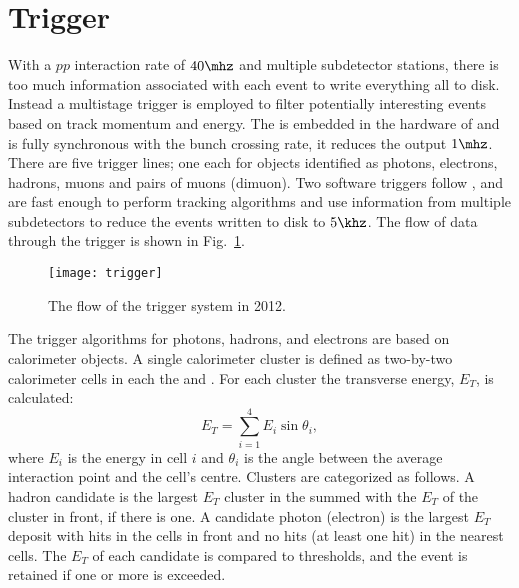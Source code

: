 \section{Trigger}
\label{sec:lhcb:trig}

With a $pp$ interaction rate of $40\mhz$ and multiple subdetector stations, there is too much
information associated with each event to write everything all to disk.
Instead a multistage trigger is employed to filter potentially interesting events based on track
momentum and energy.
The \lone is embedded in the hardware of \lhcb and is fully synchronous with
the bunch crossing rate, it reduces the output $1\mhz$.
There are five \lone trigger lines; one each for objects identified as
photons, electrons, hadrons, muons and pairs of muons (dimuon).
Two software triggers follow \lone, and are fast enough to perform tracking algorithms and use
information from
multiple subdetectors to reduce the events written to disk to $5\khz$.
The flow of data through the trigger is shown in Fig.~\ref{fig:lhcb:trigger}.

\begin{figure}
  \begin{center}
    \texttt{[image: trigger]}
  \end{center}
  \caption[LHCb trigger sequence in 2012]
  {
    The flow of the \lhcb trigger system in 2012.
  }
  \label{fig:lhcb:trigger}
\end{figure}

The \lone trigger algorithms for photons, hadrons, and electrons are based on calorimeter objects.
A single calorimeter cluster is defined as two-by-two calorimeter cells in each the \ecal and
\hcal.
For each cluster the transverse energy, $E_T$, is calculated:
\begin{equation}
  E_T = \sum_{i=1}^4E_i\sin\theta_i,
\end{equation}
where $E_i$ is the energy in cell $i$ and $\theta_i$ is the angle between the average
interaction point and the cell's centre.
Clusters are categorized as follows.
A hadron candidate is the largest $E_T$ cluster in the \hcal summed with the $E_T$ of the \ecal
cluster in front, if there is one.
A candidate photon (electron) is the largest $E_T$ deposit with hits in the \presh cells in front and
no hits (at least one hit) in the nearest \spd cells.
The $E_T$ of each candidate is compared to thresholds, and the event is retained if one or more is
exceeded.


